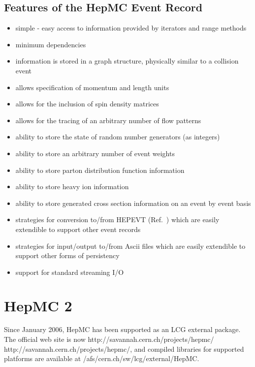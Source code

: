 \documentclass[11pt,letterpaper]{article}
\begin{document}
%
%

\subsection{Features of the HepMC Event Record}

\begin{itemize}\setlength{\itemsep}{0pt}
\item simple - easy access to information provided by iterators
      and range methods
\item minimum dependencies
\item information is stored in a graph structure, 
  physically similar to a collision event
\item allows specification of momentum and length units
\item allows for the inclusion of spin density matrices 
\item allows for the tracing of an arbitrary number of flow patterns
\item ability to store the state of random number generators (as
  integers)
\item ability to store an arbitrary number of event weights
\item ability to store parton distribution function information
\item ability to store heavy ion information 
\item ability to store generated cross section information on
      an event by event basis
\item strategies for conversion to/from HEPEVT (Ref.~\cite{Boos:2001cv}) 
  which are easily extendible to support other event records
\item strategies for input/output to/from Ascii files which
  are easily extendible to support other forms of persistency
\item support for standard streaming I/O
\end{itemize}

%
%

\section{HepMC 2}

Since January 2006, HepMC has been supported as an LCG external package.
The official web site is now \htmladdnormallink 
{http://savannah.cern.ch/projects/hepmc/} 
{http://savannah.cern.ch/projects/hepmc/}, 
and compiled libraries for supported platforms are available at 
/afs/cern.ch/sw/lcg/external/HepMC.
\end{document}
